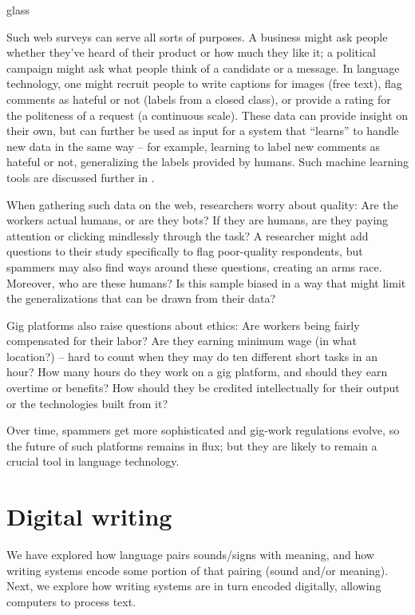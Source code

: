 \begin{tblsfilledsymbol}{}{glass}
\begin{underthehood}
Such web surveys can serve all sorts of purposes.  A business might ask people whether they've heard of their product or how much they like it; a political campaign might ask what people think of a candidate or a message.  In language technology, one might recruit people to write captions for images (free text), flag comments as hateful or not (labels from a closed class), or provide a rating for the politeness of a request (a continuous scale).  These data can provide insight on their own, but can further be used as input for a system that ``learns'' to handle new data in the same way -- for example, learning to label new comments as hateful or not, generalizing the labels provided by humans.  Such machine learning tools are discussed further in .

When gathering such data on the web, researchers worry about quality: Are the workers actual humans, or are they bots?  If they are humans, are they paying attention or clicking mindlessly through the task?  A researcher might add questions to their study specifically to  flag poor-quality respondents, but spammers may also find ways around these questions, creating an arms race.  Moreover, who are these humans?  Is this sample biased in a way that might limit the generalizations that can be drawn from their data?

Gig platforms also raise questions about ethics: Are workers being fairly compensated for their labor?  Are they earning minimum wage (in what location?) -- hard to count when they may do ten different short tasks in an hour?  How many hours do they work on a gig platform, and should they earn overtime or benefits?  How should they be credited intellectually for their output or the technologies built from it?

Over time, spammers get more sophisticated and gig-work regulations evolve, so the future of such platforms remains in flux; but they are likely to remain a crucial tool in language technology.

\end{underthehood}
\end{tblsfilledsymbol}






\section{Digital writing}
\label{sec:encoding-written-language}

We have explored how language pairs sounds/signs with meaning, and how writing systems encode some portion of that pairing (sound and/or meaning).  Next, we explore how writing systems are in turn encoded digitally, allowing computers to process text.

